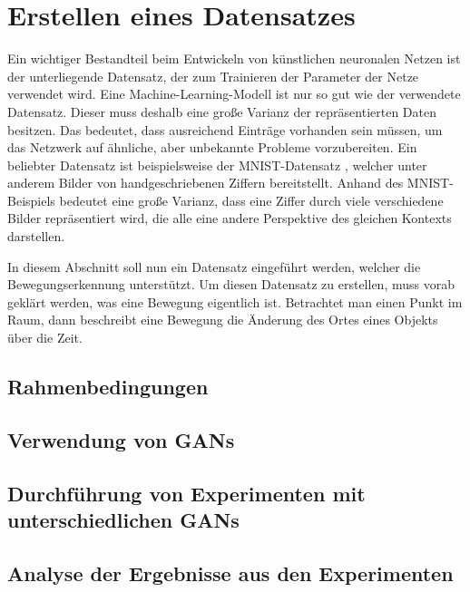 \chapter{Erstellen eines Datensatzes}\label{chapter:dataset}
Ein wichtiger Bestandteil beim Entwickeln von künstlichen neuronalen Netzen ist
der unterliegende Datensatz, der zum Trainieren der Parameter der Netze
verwendet wird. Eine Machine-Learning-Modell ist nur so gut wie der verwendete
Datensatz. Dieser muss deshalb eine große Varianz der repräsentierten Daten
besitzen. Das bedeutet, dass ausreichend Einträge vorhanden sein müssen, um das
Netzwerk auf ähnliche, aber unbekannte Probleme vorzubereiten. Ein beliebter
Datensatz ist beispielsweise der MNIST-Datensatz \cite{6296535}, welcher unter
anderem Bilder von handgeschriebenen Ziffern bereitstellt. Anhand des
MNIST-Beispiels bedeutet eine große Varianz, dass eine Ziffer durch viele
verschiedene Bilder repräsentiert wird, die alle eine andere Perspektive des
gleichen Kontexts darstellen.

In diesem Abschnitt soll nun ein Datensatz eingeführt werden, welcher die Bewegungserkennung unterstützt. Um diesen Datensatz zu erstellen, muss vorab geklärt werden, was eine Bewegung eigentlich ist. Betrachtet man einen Punkt im Raum, dann beschreibt eine Bewegung die Änderung des Ortes eines Objekts über die Zeit.

\section{Rahmenbedingungen}
\section{Verwendung von GANs}
\section{Durchführung von Experimenten mit unterschiedlichen GANs}
\section{Analyse der Ergebnisse aus den Experimenten}